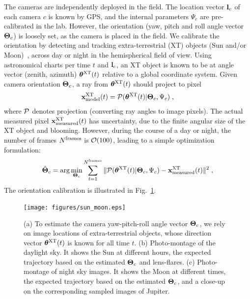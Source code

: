 \documentclass[runningheads]{llncs}
\begin{document}
The cameras are independently deployed in the field. The location vector ${\bf l}_c$
of each camera $c$ is known by GPS, and the internal parameters $\Psi_c$ are pre-calibrated in the lab. However, the orientation (yaw, pitch and roll angle vector ${\bf \Theta}_c$) is loosely set, as the camera is placed in the field. We calibrate the orientation by detecting and tracking extra-terrestrial (XT) objects (Sun and/or Moon)~\cite{Seiz2002,lalonde}, across day or night in the hemispherical field of view. Using astronomical charts per time $t$ and ${\bf l}_c$, an XT object is known to be at angle vector (zenith, azimuth) ${\bm \theta}^{\rm XT}(t)$ relative to a global coordinate system. Given camera orientation ${\bf \Theta}_c$, a ray from ${\bm \theta}^{\rm XT}(t)$ should project to pixel
\begin{equation}
{\bf x}^{\rm XT}_{\rm model}(t) = {\cal P}({\bm \theta}^{\rm XT}(t)|{\bf \Theta}_c,\Psi_c)
\;,
 \label{eq:xt}
\end{equation}
where ${\cal P}$ denotes projection (converting ray angles to image pixels).
The actual measured pixel ${\bf x}^{\rm XT}_{\rm measured}(t)$ has uncertainty, due to the finite angular size of the XT object and blooming. However, during the course of a day or night, the number of frames
  $N^{\rm frames}$ is ${\cal O}(100)$, leading to a simple optimization formulation:
\begin{equation}
 \hat{\bf \Theta}_c=\arg\min_{{\bf \Theta}_c}
 \sum_{t=1}^{N^{\rm frames}}
 \|{\cal P}({\bm \theta}^{\rm XT}(t)|{\bf \Theta}_c,\Psi_c) - {\bf x}^{\rm XT}_{\rm measured}(t)\|^2
\;,
 \label{eq:hatThetac}
\end{equation}
The orientation calibration is illustrated in Fig.~\ref{fig:sunmotion}.
\begin{figure}[t!]
\begin{center}
   \texttt{[image: figures/sun\_moon.eps]}
\end{center}
   \vspace{-0.6cm}
   \caption{(a) To estimate the camera yaw-pitch-roll angle vector ${\bf \Theta}_c$, we rely on
   image locations of extra-terrestrial objects, whose direction vector ${\bm \theta}^{\rm XT}(t)$
   is known for all time $t$. (b) Photo-montage of the daylight sky. It shows the Sun at different hours, the expected trajectory based on the estimated ${\bf \Theta}_c$ and lens-flares. (c)
   Photo-montage of night sky images. It shows the Moon at different times, the expected trajectory based on the estimated ${\bf \Theta}_c$, and a close-up on the corresponding sampled images of Jupiter.}
\label{fig:sunmotion}
\end{figure}
\end{document}
